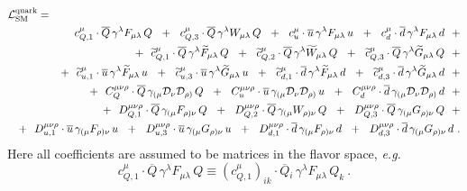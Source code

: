 \documentclass[12pt,preprintnumbers,nofootinbib]{revtex4}
\newcommand{\wt}{\widetilde}
\newcommand{\ov}{\overline}
\newcommand{\md}{\mathcal{D}}
\begin{document}
\begin{eqnarray}
\nonumber
\lefteqn{
	\mathcal{L}_{\rm SM}^{\rm quark} =
	}
	\\
\nonumber
	&&
	\phantom{+~~}
	c_{Q,1}^\mu \cdot
	\ov{Q}\, \gamma^\lambda F_{\mu\lambda}\, Q 
	~~+~~
	c_{Q,3}^\mu \cdot
	\ov{Q}\, \gamma^\lambda W_{\mu\lambda}\, Q 
	~~+~~
	c_{u}^\mu \cdot
	\ov{u}\, \gamma^\lambda F_{\mu\lambda}\, u
	~~+~~ 
	c_{d}^\mu \cdot
	\ov{d}\, \gamma^\lambda F_{\mu\lambda}\, d
	~~+
	\\
\label{SM_quark}
	&&
	+~~
	\wt{c}_{Q,1}^\mu \cdot
	\ov{Q}\, \gamma^\lambda \wt{F}_{\mu\lambda}\, Q 
	~~+~~
	\wt{c}_{Q,2}^\mu \cdot
	\ov{Q}\, \gamma^\lambda \wt{W}_{\mu\lambda}\, Q 
	~~+~~
	\wt{c}_{Q,3}^\mu \cdot
	\ov{Q}\, \gamma^\lambda \wt{G}_{\mu\lambda}\, Q 
	~~+
	\\
\nonumber
	&&
	+~~
	\wt{c}_{u,1}^\mu \cdot
	\ov{u}\, \gamma^\lambda \wt{F}_{\mu\lambda}\, u
	~~+~~ 
	\wt{c}_{u,3}^\mu \cdot
	\ov{u}\, \gamma^\lambda \wt{G}_{\mu\lambda}\, u
	~~+~~ 
	\wt{c}_{d,1}^\mu \cdot
	\ov{d}\, \gamma^\lambda \wt{F}_{\mu\lambda}\, d
	~~+~~ 
	\wt{c}_{d,3}^\mu \cdot
	\ov{d}\, \gamma^\lambda \wt{G}_{\mu\lambda}\, d
	~~+
	\\
\nonumber
	&&
	+~~
	C_Q^{\mu\nu\rho} \cdot
	\ov{Q}\, \gamma_{(\mu} \md_\nu \md_{\rho)}\, Q
	~~+~~
	C_u^{\mu\nu\rho} \cdot
	\ov{u}\, \gamma_{(\mu} \md_\nu \md_{\rho)}\, u
	~~+~~
	C_d^{\mu\nu\rho} \cdot
	\ov{d}\, \gamma_{(\mu} \md_\nu \md_{\rho)}\, d
	~~+
	\\
\nonumber
	&&
	+~~
	D_{Q,1}^{\mu\nu\rho} \cdot
	\ov{Q}\, \gamma_{(\mu} F_{\rho)\nu}\, Q
	~~+~~
	D_{Q,2}^{\mu\nu\rho} \cdot
	\ov{Q}\, \gamma_{(\mu} W_{\rho)\nu}\, Q
	~~+~~
	D_{Q,3}^{\mu\nu\rho} \cdot
	\ov{Q}\, \gamma_{(\mu} G_{\rho)\nu}\, Q
	~~+
	\\
\nonumber
	&&
	+~~
	D_{u,1}^{\mu\nu\rho} \cdot
	\ov{u}\, \gamma_{(\mu} F_{\rho)\nu}\, u
	~~+~~
	D_{u,3}^{\mu\nu\rho} \cdot
	\ov{u}\, \gamma_{(\mu} G_{\rho)\nu}\, u
	~~+~~
	D_{d,1}^{\mu\nu\rho} \cdot
	\ov{d}\, \gamma_{(\mu} F_{\rho)\nu}\, d
	~~+~~
	D_{d,3}^{\mu\nu\rho} \cdot
	\ov{d}\, \gamma_{(\mu} G_{\rho)\nu}\, d
	~.
\end{eqnarray}
	Here all coefficients are assumed to be matrices in the 
	flavor space, {\it e.g.}
\[
	c_{Q,1}^\mu \cdot
	\ov{Q}\, \gamma^\lambda F_{\mu\lambda}\, Q 
	\equiv
	\left(c_{Q,1}^\mu\right)_{ik} \cdot
	\ov{Q}{}_i\, \gamma^\lambda F_{\mu\lambda}\, Q_k
	~. 
\]
\end{document}
